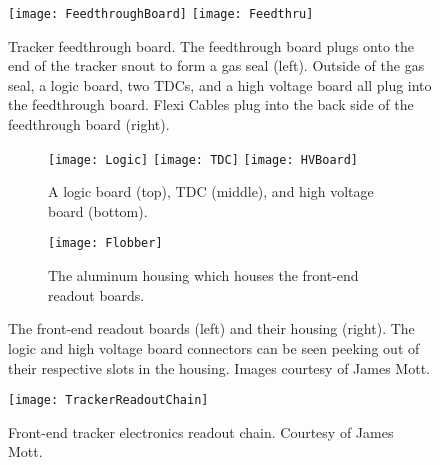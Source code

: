 



\begin{figure}
    \centering
        \texttt{[image: FeedthroughBoard]}
    \hspace{1mm}
        \texttt{[image: Feedthru]}
    \caption[Tracker feedthough board]{Tracker feedthrough board. The feedthrough board plugs onto the end of the tracker snout to form a gas seal (left). Outside of the gas seal, a logic board, two TDCs, and a high voltage board all plug into the feedthrough board. Flexi Cables plug into the back side of the feedthrough board (right).}
    \label{fig:Feedthrough}
\end{figure}

\begin{figure}
    \centering
        \begin{subfigure}[b]{0.45\textwidth}
            \centering
            \texttt{[image: Logic]}
            \texttt{[image: TDC]}
            \texttt{[image: HVBoard]}
            \caption{A logic board (top), TDC (middle), and high voltage board (bottom).}
        \end{subfigure}
    \hspace{5mm}%
        \begin{subfigure}[b]{0.45\textwidth}
            \centering
            \texttt{[image: Flobber]}
            \caption{The aluminum housing which houses the front-end readout boards.}
        \end{subfigure}
    \caption[Tracker readout boards and housing]{The front-end readout boards (left) and their housing (right). The logic and high voltage board connectors can be seen peeking out of their respective slots in the housing. Images courtesy of James Mott.}
\label{fig:FrontEndElectronics}
\end{figure}



\begin{figure}
    \centering
    \texttt{[image: TrackerReadoutChain]}
    \caption[Front-end tracker electronics readout chain]{Front-end tracker electronics readout chain. Courtesy of James Mott.}   
    \label{fig:TrackerReadoutChain}
\end{figure}



